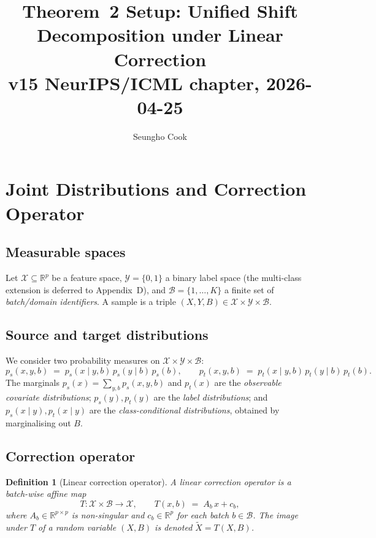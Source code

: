 \documentclass[11pt,a4paper]{article}
\title{Theorem~2 Setup: Unified Shift Decomposition under Linear Correction\\
\large v15 NeurIPS/ICML chapter, 2026-04-25}
\author{Seungho Cook}
\newtheorem{definition}{Definition}
\newcommand{\R}{\mathbb{R}}
\begin{document}
\maketitle

\section{Joint Distributions and Correction Operator}

\subsection{Measurable spaces}

Let $\mathcal{X}\subseteq\R^{p}$ be a feature space,
$\mathcal{Y}=\{0,1\}$ a binary label space (the multi-class extension is
deferred to Appendix~D), and $\mathcal{B}=\{1,\dots,K\}$ a finite set of
\emph{batch/domain identifiers}. A sample is a triple
$(X,Y,B)\in\mathcal{X}\times\mathcal{Y}\times\mathcal{B}$.

\subsection{Source and target distributions}

We consider two probability measures on
$\mathcal{X}\times\mathcal{Y}\times\mathcal{B}$:
\[
  p_s(x,y,b) \;=\; p_s(x\mid y,b)\,p_s(y\mid b)\,p_s(b),
  \qquad
  p_t(x,y,b) \;=\; p_t(x\mid y,b)\,p_t(y\mid b)\,p_t(b).
\]
The marginals
$p_s(x)=\sum_{y,b}p_s(x,y,b)$ and $p_t(x)$ are the \emph{observable
covariate distributions}; $p_s(y),p_t(y)$ are the \emph{label
distributions}; and $p_s(x\mid y), p_t(x\mid y)$ are the
\emph{class-conditional distributions}, obtained by marginalising out
$B$.

\subsection{Correction operator}

\begin{definition}[Linear correction operator]
\label{def:linear-correction}
A \emph{linear correction operator} is a batch-wise affine map
\[
  T: \mathcal{X}\times\mathcal{B} \to \mathcal{X},
  \qquad
  T(x,b) \;=\; A_b\,x + c_b,
\]
where $A_b\in\R^{p\times p}$ is non-singular and $c_b\in\R^{p}$ for
each batch $b\in\mathcal{B}$. The image under $T$ of a random variable
$(X,B)$ is denoted $\tilde X = T(X,B)$.
\end{definition}
\end{document}
